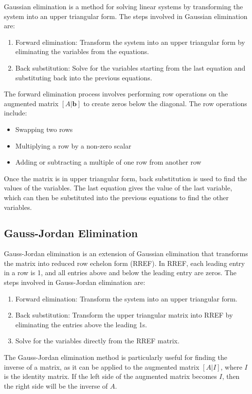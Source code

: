 Gaussian elimination is a method for solving linear systems by transforming the system into an upper triangular form. The steps involved in Gaussian elimination are:
\begin{enumerate}
	\item Forward elimination: Transform the system into an upper triangular form by eliminating the variables from the equations.
	\item Back substitution: Solve for the variables starting from the last equation and substituting back into the previous equations.
\end{enumerate}
The forward elimination process involves performing row operations on the augmented matrix \([A | \mathbf{b}]\) to create zeros below the diagonal. The row operations include:
\begin{itemize}[label=\(-\)]
	\item Swapping two rows
	\item Multiplying a row by a non-zero scalar
	\item Adding or subtracting a multiple of one row from another row
\end{itemize}
Once the matrix is in upper triangular form, back substitution is used to find the values of the variables. The last equation gives the value of the last variable, which can then be substituted into the previous equations to find the other variables.

\subsection{Gauss-Jordan Elimination}

Gauss-Jordan elimination is an extension of Gaussian elimination that transforms the matrix into reduced row echelon form (RREF). In RREF, each leading entry in a row is 1, and all entries above and below the leading entry are zeros. The steps involved in Gauss-Jordan elimination are:
\begin{enumerate}
	\item Forward elimination: Transform the system into an upper triangular form.
	\item Back substitution: Transform the upper triangular matrix into RREF by eliminating the entries above the leading 1s.
	\item Solve for the variables directly from the RREF matrix.
\end{enumerate}
The Gauss-Jordan elimination method is particularly useful for finding the inverse of a matrix, as it can be applied to the augmented matrix \([A | I]\), where \(I\) is the identity matrix. If the left side of the augmented matrix becomes \(I\), then the right side will be the inverse of \(A\).
\vspace{\baselineskip}

